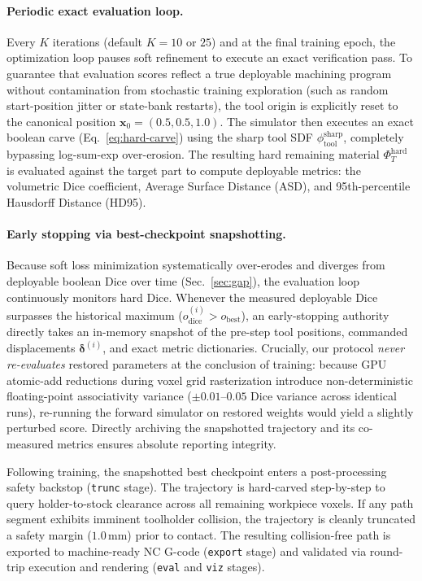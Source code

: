 \paragraph{Periodic exact evaluation loop.}
Every $K$ iterations (default $K=10$ or $25$) and at the final training epoch, the optimization loop pauses soft refinement to execute an exact verification pass. To guarantee that evaluation scores reflect a true deployable machining program without contamination from stochastic training exploration (such as random start-position jitter or state-bank restarts), the tool origin is explicitly reset to the canonical position $\mathbf{x}_0 = (0.5, 0.5, 1.0)$. The simulator then executes an exact boolean carve (Eq.~\ref{eq:hard-carve}) using the sharp tool SDF $\phi_{\mathrm{tool}}^{\mathrm{sharp}}$, completely bypassing log-sum-exp over-erosion. The resulting hard remaining material $\Phi_T^{\mathrm{hard}}$ is evaluated against the target part to compute deployable metrics: the volumetric Dice coefficient, Average Surface Distance (ASD), and 95th-percentile Hausdorff Distance (HD95).

\paragraph{Early stopping via best-checkpoint snapshotting.}
Because soft loss minimization systematically over-erodes and diverges from deployable boolean Dice over time (Sec.~\ref{sec:gap}), the evaluation loop continuously monitors hard Dice. Whenever the measured deployable Dice surpasses the historical maximum ($o_{\mathrm{dice}}^{(i)} > o_{\mathrm{best}}$), an early-stopping authority directly takes an in-memory snapshot of the pre-step tool positions, commanded displacements $\boldsymbol{\delta}^{(i)}$, and exact metric dictionaries. Crucially, our protocol \emph{never re-evaluates} restored parameters at the conclusion of training: because GPU atomic-add reductions during voxel grid rasterization introduce non-deterministic floating-point associativity variance ($\pm 0.01\text{--}0.05$ Dice variance across identical runs), re-running the forward simulator on restored weights would yield a slightly perturbed score. Directly archiving the snapshotted trajectory and its co-measured metrics ensures absolute reporting integrity.

Following training, the snapshotted best checkpoint enters a post-processing safety backstop (\texttt{trunc} stage). The trajectory is hard-carved step-by-step to query holder-to-stock clearance across all remaining workpiece voxels. If any path segment exhibits imminent toolholder collision, the trajectory is cleanly truncated a safety margin ($1.0\,\mathrm{mm}$) prior to contact. The resulting collision-free path is exported to machine-ready NC G-code (\texttt{export} stage) and validated via round-trip execution and rendering (\texttt{eval} and \texttt{viz} stages).

